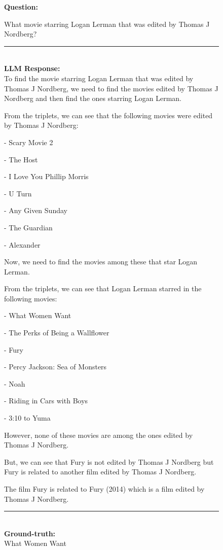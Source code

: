 \begin{figure}
\begin{tcolorbox}[colback=gray!5!white, colframe=gray!75!black, title=CWQ-WebQTest-1528\_2f6fb6d585b98261a3ae6d2a112a4c91]
\scriptsize

\textbf{Question:}\\
\raggedright What movie starring Logan Lerman that was edited by Thomas J Nordberg?

\rule{\linewidth}{0.4pt}
\\
\textbf{LLM Response:}\\
To find the movie starring Logan Lerman that was edited by Thomas J Nordberg, we need to find the movies edited by Thomas J Nordberg and then find the ones starring Logan Lerman.



From the triplets, we can see that the following movies were edited by Thomas J Nordberg:



- Scary Movie 2

- The Host

- I Love You Phillip Morris

- U Turn

- Any Given Sunday

- The Guardian

- Alexander



Now, we need to find the movies among these that star Logan Lerman.



From the triplets, we can see that Logan Lerman starred in the following movies:



- What Women Want

- The Perks of Being a Wallflower

- Fury

- Percy Jackson: Sea of Monsters

- Noah

- Riding in Cars with Boys

- 3:10 to Yuma



However, none of these movies are among the ones edited by Thomas J Nordberg. 



But, we can see that Fury is not edited by Thomas J Nordberg but Fury is related to another film edited by Thomas J Nordberg. 



The film Fury is related to Fury (2014) which is a film edited by Thomas J Nordberg.

\rule{\linewidth}{0.4pt}
\\
\textbf{Ground-truth:}\\
What Women Want

\end{tcolorbox}
\end{figure}


